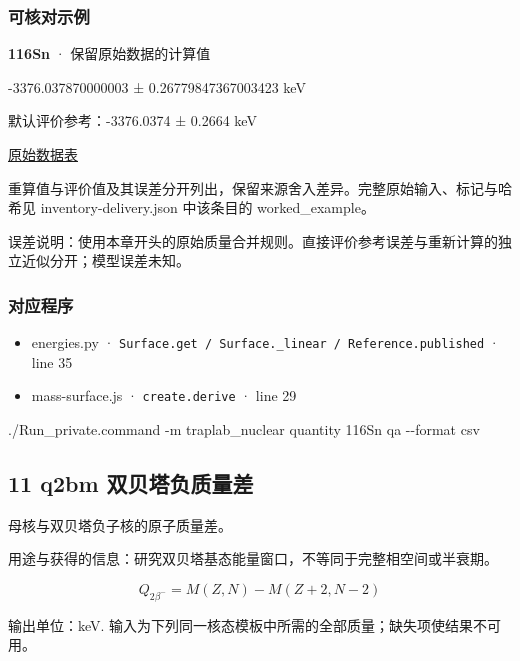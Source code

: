 \documentclass[
  11pt,
  letterpaper,
]{article}
\newenvironment{Shaded}{}{}
\newcommand{\AttributeTok}[1]{\textcolor[rgb]{0.49,0.56,0.16}{#1}}
\newcommand{\ExtensionTok}[1]{#1}
\newcommand{\NormalTok}[1]{#1}
\providecommand{\tightlist}{%
  \setlength{\itemsep}{0pt}\setlength{\parskip}{0pt}}
\begin{document}
\subsubsection{可核对示例}\label{ux53efux6838ux5bf9ux793aux4f8b-9}

\textbf{116Sn} · 保留原始数据的计算值

-3376.037870000003 ± 0.26779847367003423 keV

默认评价参考：-3376.0374 ± 0.2664 keV

\href{https://www-nds.iaea.org/amdc/ame2020/rct1.mas20.txt}{原始数据表}

重算值与评价值及其误差分开列出，保留来源舍入差异。完整原始输入、标记与哈希见
inventory-delivery.json 中该条目的 worked\_example。

误差说明：使用本章开头的原始质量合并规则。直接评价参考误差与重新计算的独立近似分开；模型误差未知。

\subsubsection{对应程序}\label{ux5bf9ux5e94ux7a0bux5e8f-9}

\begin{itemize}
\tightlist
\item
  energies.py ·
  \texttt{Surface.get\ /\ Surface.\_linear\ /\ Reference.published} ·
  line 35
\item
  mass-surface.js · \texttt{create.derive} · line 29
\end{itemize}

\begin{Shaded}
\begin{Highlighting}[]
\ExtensionTok{./Run\_private.command} \AttributeTok{{-}m}\NormalTok{ traplab\_nuclear quantity 116Sn qa }\AttributeTok{{-}{-}format}\NormalTok{ csv}
\end{Highlighting}
\end{Shaded}

\subsection{11 q2bm
双贝塔负质量差}\label{q2bm-ux53ccux8d1dux5854ux8d1fux8d28ux91cfux5dee}

母核与双贝塔负子核的原子质量差。

用途与获得的信息：研究双贝塔基态能量窗口，不等同于完整相空间或半衰期。

\[
Q_{2\beta^-}=M(Z,N)-M(Z+2,N-2)
\]

输出单位：keV.
输入为下列同一核态模板中所需的全部质量；缺失项使结果不可用。
\end{document}
